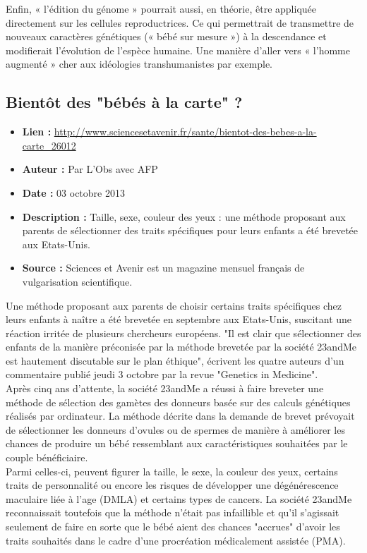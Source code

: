 \documentclass[8pt]{article}
\begin{document}
Enfin, « l’édition du génome » pourrait aussi, en théorie, être appliquée directement sur les cellules reproductrices. Ce qui permettrait de transmettre de nouveaux caractères génétiques (« bébé sur mesure ») à la descendance et modifierait l’évolution de l’espèce humaine. Une manière d’aller vers « l’homme augmenté » cher aux idéologies transhumanistes par exemple.\\

\newpage
\subsection{Bientôt des "bébés à la carte" ?}
\begin{itemize}
	\item \textbf{Lien : }  \url{http://www.sciencesetavenir.fr/sante/bientot-des-bebes-a-la-carte_26012} 
	\item \textbf{Auteur : } Par L'Obs avec AFP
	\item \textbf{Date : } 03 octobre 2013
	\item \textbf{Description : } Taille, sexe, couleur des yeux : une méthode proposant aux parents de sélectionner des traits spécifiques pour leurs enfants a été brevetée aux Etats-Unis.
	\item \textbf{Source : } Sciences et Avenir est un magazine mensuel français de vulgarisation scientifique.
\end{itemize}

Une méthode proposant aux parents de choisir certains traits spécifiques chez leurs enfants à naître a été brevetée en septembre aux Etats-Unis, suscitant une réaction irritée de plusieurs chercheurs européens. "Il est clair que sélectionner des enfants de la manière préconisée par la méthode brevetée par la société 23andMe est hautement discutable sur le plan éthique", écrivent les quatre auteurs d'un commentaire publié jeudi 3 octobre par la revue "Genetics in Medicine".\\

Après cinq ans d'attente, la société 23andMe a réussi à faire breveter une méthode de sélection des gamètes des donneurs basée sur des calculs génétiques réalisés par ordinateur. La méthode décrite dans la demande de brevet prévoyait de sélectionner les donneurs d'ovules ou de spermes de manière à améliorer les chances de produire un bébé ressemblant aux caractéristiques souhaitées par le couple bénéficiaire.\\

Parmi celles-ci, peuvent figurer la taille, le sexe, la couleur des yeux, certains traits de personnalité ou encore les risques de développer une dégénérescence maculaire liée à l'age (DMLA) et certains types de cancers. La société 23andMe reconnaissait toutefois que la méthode n'était pas infaillible et qu'il s'agissait seulement de faire en sorte que le bébé aient des chances "accrues" d'avoir les traits souhaités dans le cadre d'une procréation médicalement assistée (PMA).\\
\end{document}
